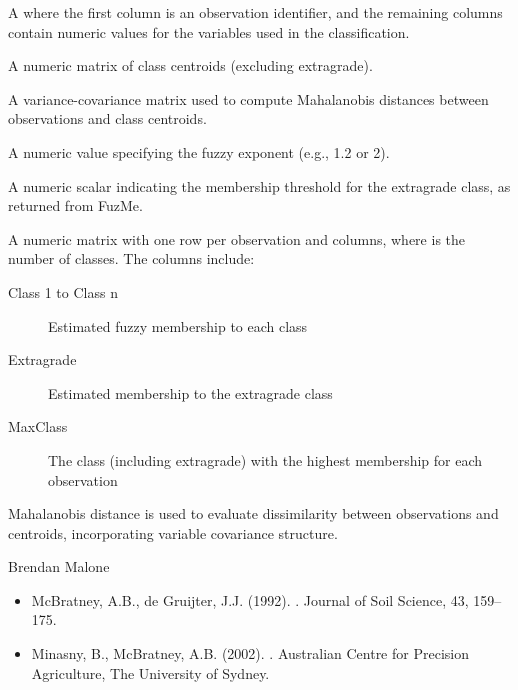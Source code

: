\documentclass[a4paper]{book}
\begin{document}
%
\begin{Arguments}
\begin{ldescription}
\item[\code{data}] A  where the first column is an observation identifier, and the remaining columns contain numeric values for the variables used in the classification.
\item[\code{centroid}] A numeric matrix of class centroids (excluding extragrade).
\item[\code{cv}] A variance-covariance matrix used to compute Mahalanobis distances between observations and class centroids.
\item[\code{expon}] A numeric value specifying the fuzzy exponent (e.g., 1.2 or 2).
\item[\code{alfa}] A numeric scalar indicating the membership threshold for the extragrade class, as returned from FuzMe.
\end{ldescription}
\end{Arguments}
%
\begin{Value}
A numeric matrix with one row per observation and  columns, where  is the number of classes. The columns include:
\begin{description}

\item[Class 1 to Class n] Estimated fuzzy membership to each class
\item[Extragrade] Estimated membership to the extragrade class
\item[MaxClass] The class (including extragrade) with the highest membership for each observation

\end{description}

\end{Value}
%
\begin{Note}
Mahalanobis distance is used to evaluate dissimilarity between observations and centroids, incorporating variable covariance structure.
\end{Note}
%
\begin{Author}
Brendan Malone
\end{Author}
%
\begin{References}
\begin{itemize}

\item{} McBratney, A.B., de Gruijter, J.J. (1992). . Journal of Soil Science, 43, 159–175.
\item{} Minasny, B., McBratney, A.B. (2002). . Australian Centre for Precision Agriculture, The University of Sydney.

\end{itemize}

\end{References}
\end{document}
